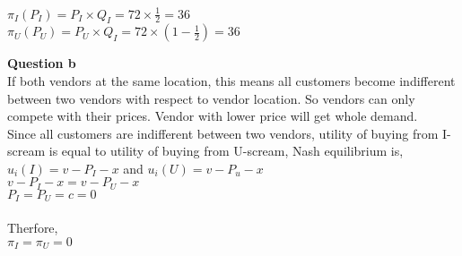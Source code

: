 \documentclass[a4paper, 12pt]{article}
\begin{document}
	$\pi_{I} (P_{I}) = P_{I} \times Q_{I} = 72 \times \frac {1}{2} = 36$\\
	$\pi_{U} (P_{U}) = P_{U} \times Q_{I} = 72 \times \left (1- \frac {1}{2} \right ) = 36$
	
\newpage

		\textbf{Question b}\\
		
		If both vendors at the same location, this means all customers become indifferent between two vendors with respect to vendor location. So vendors can only compete with their prices. Vendor with lower price will get whole demand. \\
		
		Since all customers are indifferent between two vendors, utility of buying from I-scream is equal to utility of buying from U-scream, Nash equilibrium is,\\
		
		$u_{i}(I) = v - P_{I} - x$ and $ u_{i}(U) = v - P_{u} - x$\\
		
		$v - P_{I} - x = v - P_{U} - x$\\
		
		$P_{I} =  P_{U} = c = 0$\\
		\\
		Therfore, \\
		
		$\pi_{I} = \pi_{U} = 0 $
		
	
\end{document}
